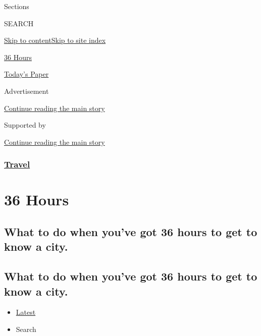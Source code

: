 Sections

SEARCH

\protect\hyperlink{site-content}{Skip to
content}\protect\hyperlink{site-index}{Skip to site index}

\href{https://www.nytimes.com/column/36-hours}{36 Hours}

\href{https://myaccount.nytimes.com/auth/login?response_type=cookie\&client_id=vi}{}

\href{https://www.nytimes.com/section/todayspaper}{Today's Paper}

Advertisement

\protect\hyperlink{after-top}{Continue reading the main story}

Supported by

\protect\hyperlink{after-sponsor}{Continue reading the main story}

\hypertarget{travel}{%
\subsubsection{\texorpdfstring{\href{/section/travel}{Travel}}{Travel}}\label{travel}}

\hypertarget{36-hours}{%
\section{36 Hours}\label{36-hours}}

\hypertarget{what-to-do-when-youve-got-36-hours-to-get-to-know-a-city}{%
\subsection{What to do when you've got 36 hours to get to know a
city.}\label{what-to-do-when-youve-got-36-hours-to-get-to-know-a-city}}

\hypertarget{what-to-do-when-youve-got-36-hours-to-get-to-know-a-city-1}{%
\subsection{What to do when you've got 36 hours to get to know a
city.}\label{what-to-do-when-youve-got-36-hours-to-get-to-know-a-city-1}}

\begin{itemize}
\tightlist
\item
  \protect\hyperlink{stream-panel}{Latest}
\item
  Search
\end{itemize}

